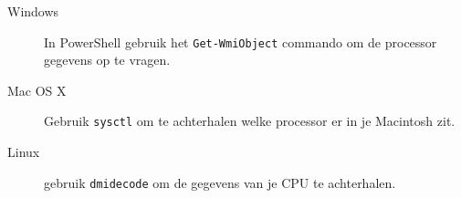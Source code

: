 \begin{description}
\item[Windows] In PowerShell gebruik het \texttt{Get-WmiObject} commando om de processor gegevens op te vragen.
\item[Mac OS X] Gebruik \texttt{sysctl} om te achterhalen welke processor er in je Macintosh zit.
\item[Linux] gebruik \texttt{dmidecode} om de gegevens van je CPU te achterhalen.
\end{description}

